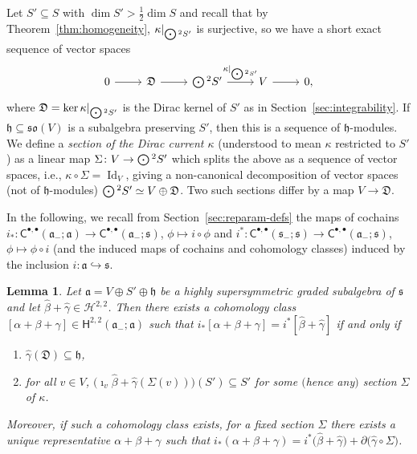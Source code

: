 \documentclass[10pt,a4paper]{amsart}
\numberwithin{equation}{section}
\newtheorem{Lemma}[Theorem]{Lemma}
\newcommand{\fa}{\mathfrak{a}}
\newcommand{\fh}{\mathfrak{h}}
\newcommand{\fs}{\mathfrak{s}}
\newcommand{\fso}{\mathfrak{so}}
\newcommand{\fD}{\mathfrak{D}}
\newcommand{\cH}{\mathcal{H}}
\newcommand{\ssC}{\mathsf{C}}
\newcommand{\ssH}{\mathsf{H}}
\newcommand{\betahat}{\widehat{\beta}}
\newcommand{\gammahat}{\widehat{\gamma}}
\newcommand{\Odot}{\mathchoice{{\textstyle\bigodot}}{\bigodot}{\bigodot}{\bigodot}}
\newcommand{\1}{\mathbbm{1}}
\DeclareMathOperator{\Id}{Id}
\begin{document}
Let $S'\subseteq S$ with $\dim S'>\frac{1}{2}\dim S$ and recall that by Theorem~\ref{thm:homogeneity}, $\kappa|_{\Odot^2S'}$ is surjective, so we have a short exact sequence of vector spaces
\[%
\begin{tikzcd}
	0 \ar[r] & \fD \ar[r] & \Odot^2S' \ar[r,"\kappa|_{\Odot^2S'}"] & V \ar[r] & 0,
\end{tikzcd}
\]
where $\fD=\ker\kappa|_{\Odot^2S'}$ is the Dirac kernel of $S'$ as in Section~\ref{sec:integrability}. If $\fh\subseteq\fso(V)$ is a subalgebra preserving $S'$, then this is a sequence of $\fh$-modules. We define a \emph{section of the Dirac current $\kappa$} (understood to mean $\kappa$ restricted to $S'$) as a linear map $\Sigma\colon V\to\Odot^2S'$ which splits the above as a sequence of vector spaces, i.e., $\kappa\circ\Sigma=\Id_V$, giving a non-canonical decomposition of vector spaces (not of $\fh$-modules) $\Odot^2S'\simeq V\oplus\fD$. Two such sections differ by a map $V\to \fD$.

In the following, we recall from Section~\ref{sec:reparam-defs} the maps of cochains $i_*\colon\ssC^{\bullet,\bullet}(\fa_-;\fa) \to \!\ssC^{\bullet,\bullet}(\fa_-;\fs)$, $\phi\mapsto i\circ\phi$ and $i^*\colon\ssC^{\bullet,\bullet}(\fs_-;\fs) \to \ssC^{\bullet,\bullet}(\fa_-;\fs)$, $\phi\mapsto \phi\circ i$ (and the induced maps of cochains and cohomology classes) induced by the inclusion $i\colon\fa\hookrightarrow\fs$.

\begin{Lemma}\label{lemma:admissible-cocycles-sections}
	Let $\fa=V\oplus S'\oplus\fh$ be a highly supersymmetric graded subalgebra of $\fs$ and let $\betahat+\gammahat\in\cH^{2,2}$. Then there exists a cohomology class $[\alpha+\beta+\gamma]\in\ssH^{2,2}(\fa_-;\fa)$ such that $i_*[\alpha+\beta+\gamma]=i^*[\betahat+\gammahat]$ if and only if
	\begin{enumerate}\itemsep=0pt
	\item[$(1)$] $\gammahat(\fD)\subseteq\fh$,
	\item[$(2)$] for all $v\in V$, $\bigl(\imath_v\betahat+\gammahat(\Sigma(v))\bigr)(S')\subseteq S'$ for some $($hence any$)$ section $\Sigma$ of $\kappa$.
	\end{enumerate}	
	Moreover, if such a cohomology class exists, for a fixed section $\Sigma$ there exists a unique representative $\alpha+\beta+\gamma$ such that $i_*(\alpha+\beta+\gamma)=i^*\bigl(\betahat+\gammahat\bigr)+\partial\bigl(\gammahat\circ\Sigma\bigr)$.
\end{Lemma}
\end{document}
